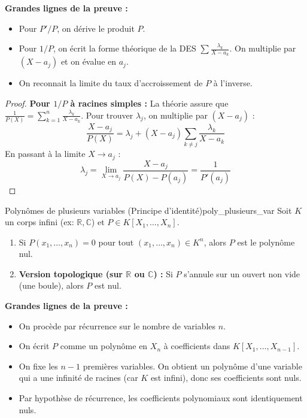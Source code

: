 \documentclass{prepacours}
\begin{document}
\noindent \textbf{Grandes lignes de la preuve :}
\begin{itemize}
    \item Pour $P'/P$, on dérive le produit $P$.
    \item Pour $1/P$, on écrit la forme théorique de la DES $\sum \frac{\lambda_k}{X-a_k}$. On multiplie par $(X-a_j)$ et on évalue en $a_j$.
    \item On reconnait la limite du taux d'accroissement de $P$ à l'inverse.
\end{itemize}

\begin{proof}
    \textbf{Pour $1/P$ à racines simples :}
    La théorie assure que $\frac{1}{P(X)} = \sum_{k=1}^n \frac{\lambda_k}{X - a_k}$.
    Pour trouver $\lambda_j$, on multiplie par $(X - a_j)$ :
    \[ \frac{X - a_j}{P(X)} = \lambda_j + (X - a_j) \sum_{k \neq j} \frac{\lambda_k}{X - a_k} \]
    En passant à la limite $X \to a_j$ :
    \[ \lambda_j = \lim_{X \to a_j} \frac{X - a_j}{P(X) - P(a_j)} = \frac{1}{P'(a_j)} \]
\end{proof}

\begin{proposition}{Polynômes de plusieurs variables (Principe d'identité)}{poly_plusieurs_var}
    Soit $K$ un corps infini (ex: $\mathbb{R}, \mathbb{C}$) et $P \in K[X_1, \dots, X_n]$.
    \begin{enumerate}
        \item Si $P(x_1, \dots, x_n) = 0$ pour tout $(x_1, \dots, x_n) \in K^n$, alors $P$ est le polynôme nul.
        \item \textbf{Version topologique (sur $\mathbb{R}$ ou $\mathbb{C}$) :} Si $P$ s'annule sur un ouvert non vide (une boule), alors $P$ est nul.
    \end{enumerate}
\end{proposition}

\noindent \textbf{Grandes lignes de la preuve :}
\begin{itemize}
    \item On procède par récurrence sur le nombre de variables $n$.
    \item On écrit $P$ comme un polynôme en $X_n$ à coefficients dans $K[X_1, \dots, X_{n-1}]$.
    \item On fixe les $n-1$ premières variables. On obtient un polynôme d'une variable qui a une infinité de racines (car $K$ est infini), donc ses coefficients sont nuls.
    \item Par hypothèse de récurrence, les coefficients polynomiaux sont identiquement nuls.
\end{itemize}
\end{document}
